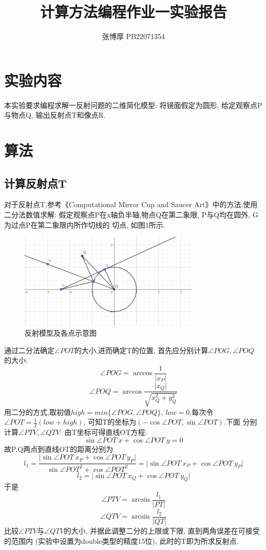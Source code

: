 \documentclass[12pt,a4paper,oneside]{article}
\title{计算方法编程作业一实验报告}
\author{张博厚 PB22071354}
\date{}
\begin{document}
\maketitle
\tableofcontents

\section{实验内容}
本实验要求编程求解一反射问题的二维简化模型: 将镜面假定为圆形, 给定观察点P与物点Q, 
输出反射点T和像点R.

\section{算法}
\subsection{计算反射点T}
对于反射点T,参考《Computational Mirror Cup and Saucer Art》中的方法,使用二分法数值求解:
假定观察点P在x轴负半轴,物点Q在第二象限, P与Q均在圆外, G为过点P在第二象限内所作切线的
切点, 如图1所示.
\begin{figure}[htbp]
    \centering
    \includegraphics[width = 0.77\textwidth]{figs/f.png}
    \caption{反射模型及各点示意图}
\end{figure}\par
通过二分法确定$\angle POT$的大小,进而确定T的位置, 首先应分别计算$\angle POG, \angle POQ$
的大小:
$$\angle POG = \arccos{\dfrac{1}{\lvert x_P \rvert}}$$
$$  \angle POQ = \arccos{\dfrac{\lvert x_Q \rvert}{\sqrt{x_Q^2+y_Q^2}}}$$
用二分的方式,取初值$high=min\{\angle POG,\angle POQ\},\ low=0$,每次令
$\angle POT = \frac{1}{2}(low+high)$, 可知T的坐标为$(-\cos{\angle POT}, \sin{\angle POT})$.下面
分别计算$\angle PTV, \angle QTV$: 由T坐标可得直线OT方程:
\begin{equation}
    \sin{\angle POT}\ x+\cos{\angle POT}\ y=0
\end{equation}
故P,Q两点到直线OT的距离分别为
\begin{equation*}
    l_1 = \dfrac{\lvert \sin{\angle POT}\ x_P+\cos{\angle POT}\ y_P \rvert}{\sin{\angle POT}^2+\cos{\angle POT}^2 }
        =\lvert \sin{\angle POT}\ x_P+\cos{\angle POT}\ y_P \rvert
\end{equation*}
\begin{equation*}
    l_2 = \lvert \sin{\angle POT}\ x_Q+\cos{\angle POT}\ y_Q \rvert
\end{equation*}
于是
$$\angle PTV = \arcsin{\dfrac{l_1}{\lvert PT \rvert}}$$
$$\angle QTV = \arcsin{\dfrac{l_2}{\lvert QT \rvert}}$$
比较$\angle PTV$与$\angle QTV$的大小, 并据此调整二分的上限或下限, 直到两角误差在可接受的范围内
(实验中设置为double类型的精度15位), 此时的T即为所求反射点.
\end{document}
